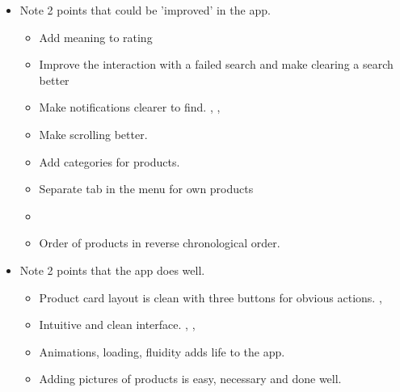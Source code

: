 \begin{itemize}
	\item Note 2 points that could be 'improved' in the app.
		\begin{itemize}
			\item Add meaning to rating 
			\item Improve the interaction with a failed search and make clearing a search better 
			\vspace{0.5cm}
			\item Make notifications clearer to find. , , 
			\item Make scrolling better. 
			\vspace{0.5cm}
			\item Add categories for products. 
			\item Separate tab in the menu for own products 
			\vspace{0.5cm}
			\item {}
			\item Order of products in reverse chronological order.
		\end{itemize}
		\tab 
	\item Note 2 points that the app does well.
		\begin{itemize}
			\item Product card layout is clean with three buttons for obvious actions. , 
			\item Intuitive and clean interface. , , 
			\item Animations, loading, fluidity adds life to the app. 
			\item Adding pictures of products is easy, necessary and done well. 
		\end{itemize}		 
\end{itemize}